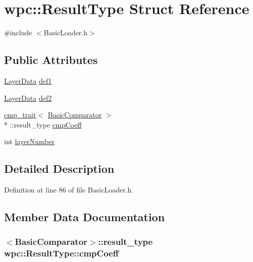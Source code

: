 \hypertarget{structwpc_1_1_result_type}{\section{wpc\-:\-:Result\-Type Struct Reference}
\label{structwpc_1_1_result_type}
}


{\ttfamily \#include $<$Basic\-Loader.\-h$>$}

\subsection*{Public Attributes}
\begin{DoxyCompactItemize}
\item 
\hyperlink{structwpc_1_1_layer_data}{Layer\-Data} \hyperlink{structwpc_1_1_result_type_acb358c96a9b53ed4dea03850919fd401}{def1}
\item 
\hyperlink{structwpc_1_1_layer_data}{Layer\-Data} \hyperlink{structwpc_1_1_result_type_a7d4052263b6c8db4579abcbd3d75104a}{def2}
\item 
\hyperlink{structwpc_1_1cmp__trait}{cmp\-\_\-trait}$<$ \hyperlink{classwpc_1_1_basic_comparator}{Basic\-Comparator} $>$\\*
\-::result\-\_\-type \hyperlink{structwpc_1_1_result_type_a98aad5af9d96d2497888b663e7febbb1}{cmp\-Coeff}
\item 
int \hyperlink{structwpc_1_1_result_type_a2745cac2ffc4941b333aefca7f97368c}{layer\-Number}
\end{DoxyCompactItemize}


\subsection{Detailed Description}


Definition at line 86 of file Basic\-Loader.\-h.



\subsection{Member Data Documentation}
\hypertarget{structwpc_1_1_result_type_a98aad5af9d96d2497888b663e7febbb1}{
\subsubsection[{cmp\-Coeff}]{$<${\bf Basic\-Comparator}$>$\-::result\-\_\-type wpc\-::\-Result\-Type\-::cmp\-Coeff}}\label{structwpc_1_1_result_type_a98aad5af9d96d2497888b663e7febbb1}



